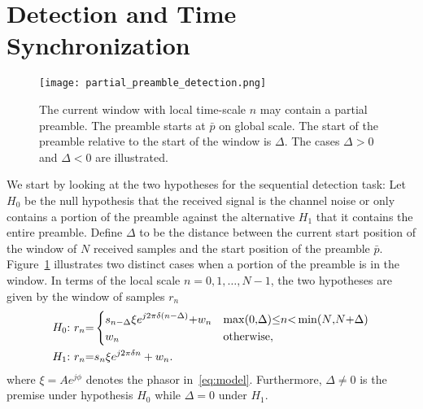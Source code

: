 \section{Detection and Time Synchronization}%
\label{sec:detection}

\begin{figure}[t]
  \centerline{\texttt{[image: partial\_preamble\_detection.png]}}
  \caption{The current window with local time-scale $n$ may contain a
    partial preamble. The preamble starts at $\bar{p}$ on global scale.
    The start of the preamble relative to the start
    of the window is $\Delta$. The cases $\Delta >0$ and $\Delta < 0$
    are illustrated.}
  \label{fig:partial_preamble_detection}
  \end{figure}

We start by looking at the two hypotheses for the sequential detection task:
Let $H_0$ be the null hypothesis that the received signal is the
channel noise or only contains a portion of the preamble against the
alternative $H_1$ that it contains the entire preamble.  
Define $\Delta$ to be the distance between the current start position of the window
of $N$ received samples and the start position of the preamble $\bar{p}$.
Figure~\ref{fig:partial_preamble_detection} illustrates two distinct cases when a portion of the 
preamble is in the window.
In terms of the local scale $n=0,1,\ldots,N-1$, the two hypotheses are given by the window of samples $r_n$
\begin{equation}
  \label{eq:two hypotheses}
  \begin{aligned}
  &H_0{:}~r_n{=}
  \begin{dcases}
      s_{n-\Delta}\xi e^{j2\pi\delta (n-\Delta)}{+}w_n & \max(0{,}\Delta){\leq} n{<} \min(N{,}N{+}\Delta) \\
      w_n & \text{otherwise},
  \end{dcases} \\
  &H_1{:}~r_n{=}s_n\xi e^{j2\pi\delta n}+w_n.
  \end{aligned}
\end{equation}
where $\xi=Ae^{j\phi}$ denotes the phasor in~\eqref{eq:model}.
Furthermore, $\Delta \neq 0$ is the premise under hypothesis $H_0$
while $\Delta=0$ under $H_1$.  

